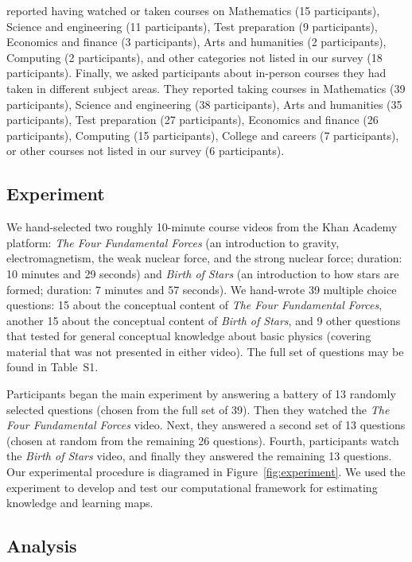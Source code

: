 \documentclass[10pt]{article}
\newcommand{\questions}{S1}
\begin{document}
reported having watched or taken courses on Mathematics (15
participants), Science and engineering (11 participants), Test
preparation (9 participants), Economics and finance (3 participants),
Arts and humanities (2 participants), Computing (2 participants), and
other categories not listed in our survey (18 participants).  Finally,
we asked participants about in-person courses they had taken in
different subject areas.  They reported taking courses in Mathematics
(39 participants), Science and engineering (38 participants), Arts and
humanities (35 participants), Test preparation (27 participants),
Economics and finance (26 participants), Computing (15 participants),
College and careers (7 participants), or other courses not listed in
our survey (6 participants).


\subsection*{Experiment}

We hand-selected two roughly 10-minute course videos from the Khan Academy
platform: \textit{The Four Fundamental Forces} (an introduction to gravity,
electromagnetism, the weak nuclear force, and the strong nuclear force;
duration: 10 minutes and 29 seconds) and \textit{Birth of Stars} (an
introduction to how stars are formed; duration: 7 minutes and 57 seconds). We
hand-wrote 39 multiple choice questions: 15 about the conceptual content of
\textit{The Four Fundamental Forces}, another 15 about the conceptual content
of \textit{Birth of Stars}, and 9 other questions that tested for general
conceptual knowledge about basic physics (covering material that was not
presented in either video). The full set of questions may be found in
Table~\questions.



Participants began the main experiment by answering a battery of 13 randomly
selected questions (chosen from the full set of 39). Then they watched the
\textit{The Four Fundamental Forces} video. Next, they answered a second set of
13 questions (chosen at random from the remaining 26 questions). Fourth,
participants watch the \textit{Birth of Stars} video, and finally they answered
the remaining 13 questions. Our experimental procedure is diagramed in
Figure~\ref{fig:experiment}. We used the experiment to develop and test our
computational framework for estimating knowledge and learning maps.

\subsection*{Analysis}
\end{document}
